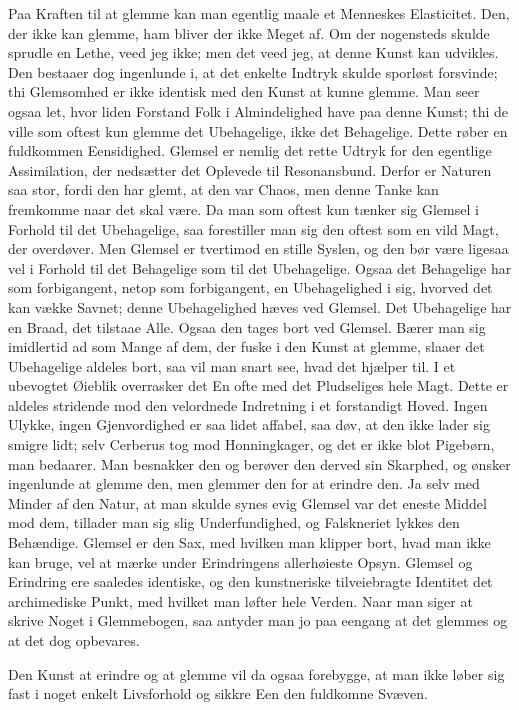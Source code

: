 \documentclass[12pt,a4paper]{article}
\begin{document}
Paa Kraften til at glemme kan man egentlig maale et Menneskes Elasticitet. Den, der ikke kan glemme, ham bliver der ikke Meget af. Om der nogensteds skulde sprudle en Lethe, veed jeg ikke; men det veed jeg, at denne Kunst kan udvikles. Den bestaaer dog ingenlunde i, at det enkelte Indtryk skulde sporløst forsvinde; thi Glemsomhed er ikke identisk med den Kunst at kunne glemme. Man seer ogsaa let, hvor liden Forstand Folk i Almindelighed have paa denne Kunst; thi de ville som oftest kun glemme det Ubehagelige, ikke det Behagelige. Dette røber en fuldkommen Eensidighed. Glemsel er nemlig det rette Udtryk for den egentlige Assimilation, der nedsætter det Oplevede til Resonansbund. Derfor er Naturen saa stor, fordi den har glemt, at den var Chaos, men denne Tanke kan fremkomme naar det skal være. Da man som oftest kun tænker sig Glemsel i Forhold til det Ubehagelige, saa forestiller man sig den oftest som en vild Magt, der overdøver. Men Glemsel er tvertimod en stille Syslen, og den bør være ligesaa vel i Forhold til det Behagelige som til det Ubehagelige. Ogsaa det Behagelige har som forbigangent, netop som forbigangent, en Ubehagelighed i sig, hvorved det kan vække Savnet; denne Ubehagelighed hæves ved Glemsel. Det Ubehagelige har en Braad, det tilstaae Alle. Ogsaa den tages bort ved Glemsel. Bærer man sig imidlertid ad som Mange af dem, der fuske i den Kunst at glemme, slaaer det Ubehagelige aldeles bort, saa vil man snart see, hvad det hjælper til. I et ubevogtet Øieblik overrasker det En ofte med det Pludseliges hele Magt. Dette er aldeles stridende mod den velordnede Indretning i et forstandigt Hoved. Ingen Ulykke, ingen Gjenvordighed er saa lidet affabel, saa døv, at den ikke lader sig smigre lidt; selv Cerberus tog mod Honningkager, og det er ikke blot Pigebørn, man bedaarer. Man besnakker den og berøver den derved sin Skarphed, og ønsker ingenlunde at glemme den, men glemmer den for at erindre den. Ja selv med Minder af den Natur, at man skulde synes evig Glemsel var det eneste Middel mod dem, tillader man sig slig Underfundighed, og Falskneriet lykkes den Behændige. Glemsel er den Sax, med hvilken man klipper bort, hvad man ikke kan bruge, vel at mærke under Erindringens allerhøieste Opsyn. Glemsel og Erindring ere saaledes identiske, og den kunstneriske tilveiebragte Identitet det archimediske Punkt, med hvilket man løfter hele Verden. Naar man siger at skrive Noget i Glemmebogen, saa antyder man jo paa eengang at det glemmes og at det dog opbevares.

Den Kunst at erindre og at glemme vil da ogsaa forebygge, at man ikke løber sig fast i noget enkelt Livsforhold og sikkre Een den fuldkomne Svæven.
\end{document}

